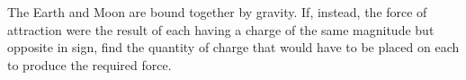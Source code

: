         The Earth and Moon are bound together by gravity.  If,
        instead, the force of attraction were the result of each
        having a charge of the same magnitude but opposite in sign,
        find the quantity of charge that would have to be placed on
        each to produce the required force.\answercheck
